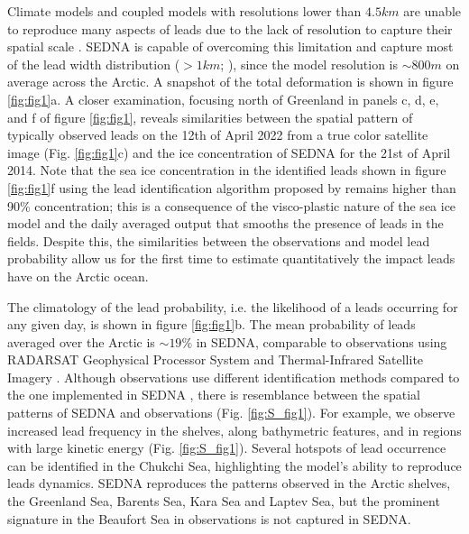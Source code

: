 \documentclass[lineno,sn-basic]{sn-jnl}%
\begin{document}
Climate models and coupled models with resolutions lower than $4.5km$ are unable to reproduce many aspects of leads due to the lack of resolution to capture their spatial scale \citep{Wang_leads_2016}. SEDNA is capable of overcoming this limitation and capture most of the lead width distribution ($>1km$; \citealt{Wernecke_Lead_2015}), since the model resolution is $\sim 800m$ on average across the Arctic. 
A snapshot of the total deformation is shown in figure \ref{fig:fig1}a. A closer examination, focusing north of Greenland in panels c, d, e, and f of figure \ref{fig:fig1}, reveals similarities between the spatial pattern of typically observed leads on the 12th of April 2022 from a true color satellite image (Fig. \ref{fig:fig1}c) and the ice concentration of SEDNA for the 21st of April 2014. Note that the sea ice concentration in the identified leads shown in figure \ref{fig:fig1}f using the lead identification algorithm proposed by \citet{Hutter_identification_2019} remains higher than 90\% concentration; this is a consequence of the visco-plastic nature of the sea ice model and the daily averaged output that smooths the presence of leads in the fields. 
Despite this, the similarities between the observations and model lead probability allow us for the first time to estimate quantitatively the impact leads have on the Arctic ocean.

The climatology of the lead probability, i.e. the likelihood of a leads occurring for any given day, is shown in figure \ref{fig:fig1}b. The mean probability of leads averaged over the Arctic is $\sim 19\%$ in SEDNA, comparable to observations using RADARSAT Geophysical Processor System and Thermal-Infrared Satellite Imagery \citep{Wernecke_Lead_2015,Willmes_leads_currents_2023}. Although observations use different identification methods compared to the one implemented in SEDNA \citep{Hutter_identification_2019}, there is resemblance between the spatial patterns of SEDNA and observations (Fig. \ref{fig:S_fig1}). For example, we observe increased lead frequency in the shelves, along bathymetric features, and in regions with large kinetic energy (Fig. \ref{fig:S_fig1}). Several hotspots of lead occurrence can be identified in the Chukchi Sea, highlighting the model's ability to reproduce leads dynamics. SEDNA reproduces the patterns observed in the Arctic shelves, the Greenland Sea, Barents Sea, Kara Sea and Laptev Sea, but the prominent signature in the Beaufort Sea in observations is not captured in SEDNA. 
\end{document}
